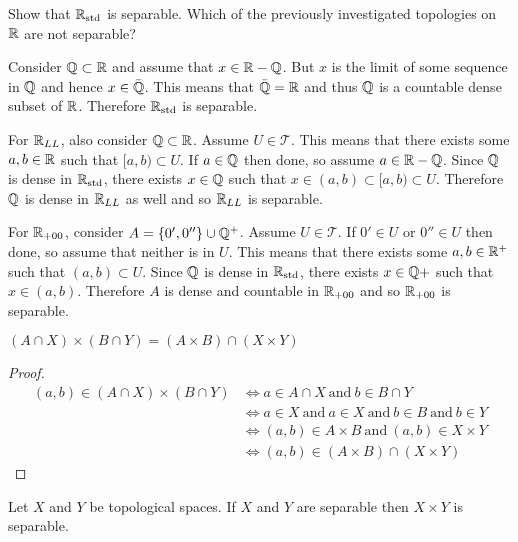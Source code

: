 \documentclass[letterpaper,12pt,fleqn]{article}
\newcommand{\T}{\mathscr{T}}
\newcommand{\Rs}{\R_{\text{std}}}
\newcommand{\RL}{\R_{LL}}
\newcommand{\RZ}{\R_{+00}}
\begin{document}
\begin{example}
  Show that \(\Rs\) is separable.  Which of the previously investigated topologies on \(\mathbb{R}\) are not separable?

  Consider \(\mathbb{Q}\subset\mathbb{R}\) and assume that \(x\in\mathbb{R}-\mathbb{Q}\).  But \(x\) is the limit of some sequence in \(\mathbb{Q}\) and
  hence \(x\in\bar{\mathbb{Q}}\).  This means that \(\bar{\mathbb{Q}}=\mathbb{R}\) and thus \(\mathbb{Q}\) is a countable dense subset of \(\mathbb{R}\).
  Therefore \(\Rs\) is separable.

  For \(\RL\), also consider \(\mathbb{Q}\subset\mathbb{R}\).  Assume \(U\in\T\).  This means that there exists some \(a,b\in\mathbb{R}\)
  such that \([a,b)\subset U\).  If \(a\in\mathbb{Q}\) then done, so assume \(a\in\mathbb{R}-\mathbb{Q}\).  Since \(\mathbb{Q}\) is dense in
  \(\Rs\), there exists \(x\in\mathbb{Q}\) such that \(x\in(a,b)\subset[a,b)\subset U\).  Therefore \(\mathbb{Q}\) is dense in
  \(\RL\) as well and so \(\RL\) is separable.

  For \(\RZ\), consider \(A=\{0',0''\}\cup\mathbb{Q}^+\).  Assume \(U\in\T\).  If \(0'\in U\) or \(0''\in U\) then done,
  so assume that neither is in \(U\).  This means that there exists some \(a,b\in\mathbb{R}^+\) such that \((a,b)\subset U\).
  Since \(\mathbb{Q}\) is dense in \(\Rs\), there exists \(x\in\mathbb{Q}+\) such that \(x\in(a,b)\).  Therefore \(A\) is dense
  and countable in \(\RZ\) and so \(\RZ\) is separable.
\end{example}

\begin{lemma}
  \((A\cap X)\times(B\cap Y)=(A\times B)\cap(X\times Y)\)
\end{lemma}

\begin{proof}
  \begin{align*}
    (a,b)\in(A\cap X)\times(B\cap Y) &\iff a\in A\cap X\ \text{and}\ b\in B\cap Y \\
    &\iff a\in X\ \text{and}\ a\in X\ \text{and}\ b\in B\ \text{and}\ b\in Y \\
    &\iff (a,b)\in A\times B\ \text{and}\ (a,b)\in X\times Y \\
    &\iff (a,b)\in (A\times B)\cap(X\times Y)
  \end{align*}
\end{proof}

\begin{theorem}
  Let \(X\) and \(Y\) be topological spaces.  If \(X\) and \(Y\) are separable then \(X\times Y\) is separable.
\end{theorem}
\end{document}
